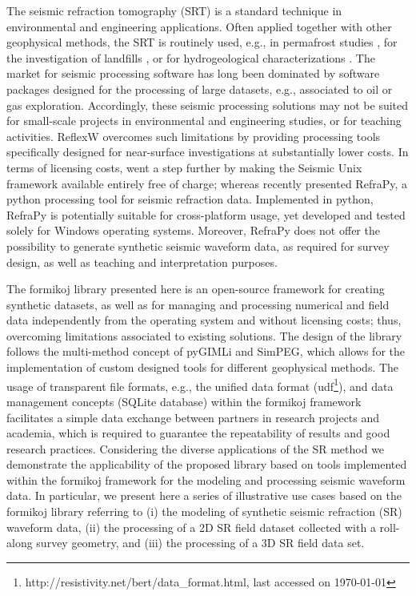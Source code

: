 \documentclass[a4paper,fleqn]{cas-sc}
\begin{document}
The seismic refraction tomography (SRT) is a standard technique in environmental and engineering applications. Often applied together with other geophysical methods, the SRT is routinely used, e.g., in 
permafrost studies \citep[e.g.,][]{draebing2016, steiner2021}, for the investigation of landfills \citep[e.g.,][]{nguyen2018, steiner2022}, or for hydrogeological characterizations \citep[e.g.,][]{buecker2021}. 
The market for seismic processing software has long been dominated by software packages designed for the processing of large datasets, e.g., associated to oil or gas exploration. 
Accordingly, these seismic processing solutions may not be suited for small-scale projects in environmental and engineering studies, or for teaching activities. 
ReflexW overcomes such limitations by providing processing tools specifically designed for near-surface investigations at substantially lower costs. In terms of licensing costs, 
\citet{stockwell1999} went a step further by making the Seismic Unix framework available entirely free of charge; whereas \citet{guedes2022} recently presented RefraPy, a python processing tool for seismic refraction data. 
Implemented in python, RefraPy is potentially suitable for cross-platform usage, yet 
\citet{guedes2022} 
developed and tested 
solely for Windows operating systems. Moreover, RefraPy does not offer the possibility to generate synthetic seismic waveform data, as required for survey design, as well as teaching and interpretation purposes.

The formikoj library presented here is an open-source framework for creating synthetic datasets, as well as for managing and processing numerical and field data independently from the operating system and without licensing costs; thus, overcoming limitations associated to existing solutions. The design of the library follows the multi-method concept of pyGIMLi and SimPEG, which allows for the implementation of custom designed tools for different geophysical methods. 
The usage of transparent file formats, e.g., the unified data format (udf\footnote{http://resistivity.net/bert/data\_format.html, last accessed on \today}), and data management concepts (SQLite database) within the formikoj framework facilitates a simple data exchange between partners in research projects and academia, which is required to guarantee the repeatability of results and good research practices.
Considering the diverse applications of the SR method we demonstrate the applicability of the proposed library based on tools implemented within the formikoj framework for the modeling and processing seismic waveform data. 
In particular, we present here a series of illustrative use cases based on the formikoj library referring to (i) the modeling of synthetic seismic refraction (SR) waveform data, (ii) the processing of a 2D SR field dataset collected with a roll-along survey geometry, and (iii) the processing of a 3D SR field data set. 
\end{document}

